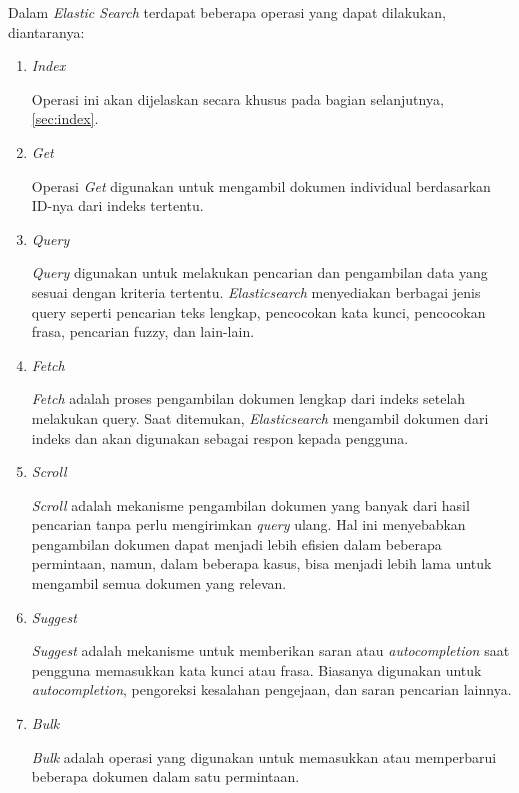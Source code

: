 Dalam \textit{Elastic Search} terdapat beberapa operasi yang dapat dilakukan, diantaranya:
\begin{enumerate}
    \item \textit{Index}
    
    Operasi ini akan dijelaskan secara khusus pada bagian selanjutnya, \ref{sec:index}.

    \item \textit{Get}
    
    Operasi \textit{Get} digunakan untuk mengambil dokumen individual berdasarkan ID-nya dari indeks tertentu.
    
    \item \textit{Query}
    
    \textit{Query} digunakan untuk melakukan pencarian dan pengambilan data yang sesuai dengan kriteria tertentu. \textit{Elasticsearch} menyediakan berbagai jenis query seperti pencarian teks lengkap, pencocokan kata kunci, pencocokan frasa, pencarian fuzzy, dan lain-lain.
    
    \item \textit{Fetch}
    
    \textit{Fetch} adalah proses pengambilan dokumen lengkap dari indeks setelah melakukan query. Saat ditemukan, \textit{Elasticsearch} mengambil dokumen dari indeks dan akan digunakan sebagai respon kepada pengguna.
    
    \item \textit{Scroll}
    
    \textit{Scroll} adalah mekanisme pengambilan dokumen yang banyak dari hasil pencarian tanpa perlu mengirimkan \textit{query} ulang. Hal ini menyebabkan pengambilan dokumen dapat menjadi lebih efisien dalam beberapa permintaan, namun, dalam beberapa kasus, bisa menjadi lebih lama untuk mengambil semua dokumen yang relevan.
    
    \item \textit{Suggest}
    
    \textit{Suggest} adalah mekanisme untuk memberikan saran atau \textit{autocompletion} saat pengguna memasukkan kata kunci atau frasa. Biasanya digunakan untuk \textit{autocompletion}, pengoreksi kesalahan pengejaan, dan saran pencarian lainnya.
    
    \item \textit{Bulk}
    
    \textit{Bulk} adalah operasi yang digunakan untuk memasukkan atau memperbarui beberapa dokumen dalam satu permintaan.
    

\end{enumerate}
